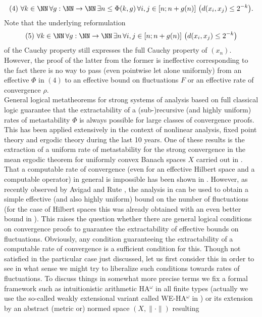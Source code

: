 \[ (4) \ \forall k\in\NN\,\forall g:\NN\to\NN\, \exists n\le \Phi(k,g) 
\,\forall i,j \in [n;n+g(n)]\ \big( d(x_i,x_j)\le 2^{-k}\big). \]
Note that the underlying reformulation 
\[ (5) \ \forall k\in \NN\,\forall g:\NN\to\NN\, \exists n
\,\forall i,j \in [n;n+g(n)]\ \big( d(x_i,x_j)\le 2^{-k}\big) \]
of the Cauchy property 
still expresses the full Cauchy property of $(x_n).$ However, the proof 
of the latter from the former is ineffective corresponding to the fact 
there is no way to 
pass (even pointwise let alone uniformly) 
from an effective $\Phi$ in $(4)$ to an 
effective bound on fluctuations $F$ or an effective rate of convergence $\rho.$
\\[2mm] General logical metatheorems for strong systems of analysis based 
on full classical logic guarantee that the extractability of a (sub-)recursive 
(and highly uniform) rates of metastability $\Phi$ is always possible for 
large classes of convergence proofs. This has been applied extensively in 
the context of nonlinear analysis, fixed point theory and ergodic theory 
during the last 10 years. One of these results is the extraction of a 
uniform rate of metastability for the strong convergence in the mean 
ergodic theorem for uniformly convex Banach spaces $X$ carried out in 
\cite{Kohlenbach/Leustean4}. That a computable rate of convergence (even 
for an effective Hilbert space and a computable operator) in general 
is impossible has been shown in \cite{AGT10}. However, 
as recently observed by Avigad and Rute \cite{Avigad/Rute}, the analysis 
in \cite{Kohlenbach/Leustean4} can be used to obtain a simple effective (and 
also highly uniform) 
bound on the number of fluctuations (for the case of Hilbert spaces this 
was already obtained with an even better bound in \cite{Jones}). This 
raises the question whether there are general logical conditions on 
convergence proofs to guarantee the extractability of effective bounds 
on fluctuations. Obviously, any condition guaranteeing the extractability of 
a computable rate of convergence is a sufficient condition for this. Though 
not satisfied in the particular case just discussed, let us first consider 
this in order to see in what sense we might try to liberalize such conditions 
towards rates of fluctuations. To discuss things in somewhat more precise 
terms we fix a formal framework such as intuitionistic arithmetic 
HA$^{\omega}$ in all finite types (actually we use the so-called weakly 
extensional variant called WE-HA$^{\omega}$ in \cite{Kohlenbach08}) 
or its extension by an abstract (metric or) 
normed space $(X,\|\cdot\|)$ resulting 
